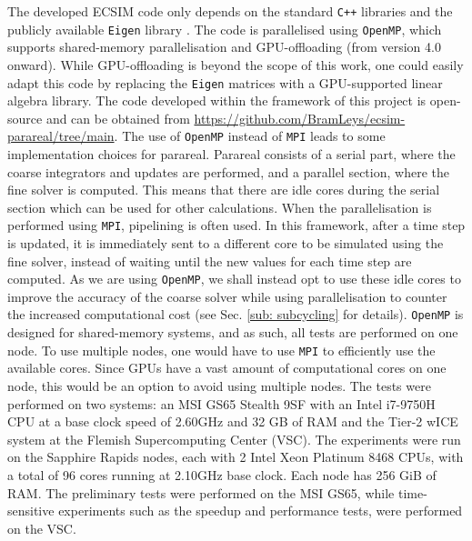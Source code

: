 The developed ECSIM code only depends on the standard \texttt{C++} libraries and the publicly available \texttt{Eigen} library \cite{gael_guennebaud_and_benoit_jacob_and_others_eigen_2010}. The code is parallelised using \texttt{OpenMP}, which supports shared-memory parallelisation and GPU-offloading (from version  4.0 onward). While GPU-offloading is beyond the scope of this work, one could easily adapt this code by replacing the \texttt{Eigen} matrices with a GPU-supported linear algebra library. The code developed within the framework of this project is open-source and can be obtained from \url{https://github.com/BramLeys/ecsim-parareal/tree/main}. The use of \texttt{OpenMP} instead of \texttt{MPI} leads to some implementation choices for parareal. Parareal consists of a serial part, where the coarse integrators and updates are performed, and a parallel section, where the fine solver is computed. This means that there are idle cores during the serial section which can be used for other calculations. When the parallelisation is performed using \texttt{MPI}, pipelining is often used. In this framework, after a time step is updated, it is immediately sent to a different core to be simulated using the fine solver, instead of waiting until the new values for each time step are computed. As we are using \texttt{OpenMP}, we shall instead opt to use these idle cores to improve the accuracy of the coarse solver while using parallelisation to counter the increased computational cost (see Sec. \ref{sub: subcycling} for details). \texttt{OpenMP} is designed for shared-memory systems, and as such, all tests are performed on one node. 
To use multiple nodes, one would have to use \texttt{MPI} to efficiently use the available cores. Since GPUs have a vast amount of computational cores on one node, this would be an option to avoid using multiple nodes. 
The tests were performed on two systems: an MSI GS65 Stealth 9SF with an Intel i7-9750H CPU at a base clock speed of 2.60GHz and 32 GB of RAM and the Tier-2 wICE system at the Flemish Supercomputing Center (VSC). The experiments were run on the Sapphire Rapids nodes, each with 2 Intel Xeon Platinum 8468 CPUs, with a total of 96 cores running at 2.10GHz base clock. Each node has 256 GiB of RAM. The preliminary tests were performed on the MSI GS65, while time-sensitive experiments such as the speedup and performance tests, were performed on the VSC. 

 
